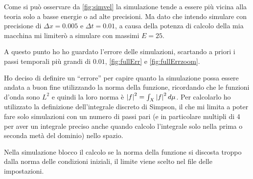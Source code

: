 Come si pu\`o osservare da \eqref{fig:simvel} la simulazione tende a essere pi\`u vicina alla teoria solo a basse energie o ad alte precisioni. Ma dato che intendo simulare con precisione di $\Delta x =0.005$ e $\Delta t = 0.01$, a causa della potenza di calcolo della mia macchina mi limiter\`o a simulare con massimi $E=25$.

A questo punto ho ho guardato l'errore delle simulazioni, scartando a priori i passi temporali pi\`u grandi di $0.01$, \autoref{fig:fullErr} e \ref{fig:fullErrzoom}.

Ho deciso di definire un ``errore'' per capire quanto la simulazione possa essere andata a buon fine utilizzando la norma della funzione, ricordando che le funzioni d'onda sono $L^2$ e quindi la loro norma \`e  $\lr||f^2=\int_X\lr||f^2d\mu$.
Per calcolarlo ho utilizzato la definizione dell'integrale discreto di Simpson, il che mi limita a poter fare solo simulazioni con un numero di passi pari (e in particolare multipli di 4 per aver un integrale preciso anche quando calcolo l'integrale solo nella prima o seconda met\`a del dominio) nello spazio.

Nella simulazione blocco il calcolo se la norma della funzione si discosta troppo dalla norma delle condizioni iniziali, il limite viene scelto nel file delle impostazioni.

